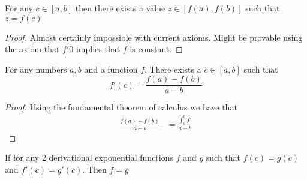 \begin{theorem}
  For any $c \in [a,b]$ then there exists a value $z \in [f(a),f(b)]$ such that $z=f(c)$
\end{theorem}
\begin{proof}
  Almost certainly impossible with current axioms. Might be provable using the axiom that $f'0$ implies that $f$ is constant.
\end{proof}
\begin{theorem}
  For any numbers $a,b$ and a function $f$. There exists a $c \in [a,b]$ such that
  \begin{equation*}
    f'(c)=\frac{f(a)-f(b)}{a-b}
  \end{equation*}  
\end{theorem}
\begin{proof}
  Using the fundamental theorem of calculus we have that
  \begin{align*}
    \frac{f(a)-f(b)}{a-b}&=\frac{\int_a^b f'}{a-b}
  \end{align*}
\end{proof}
\begin{theorem}
  If for any 2 derivational exponential functions $f$ and $g$ such that $f(c)=g(c)$ and $f'(c)=g'(c)$. Then $f=g$
\end{theorem}
